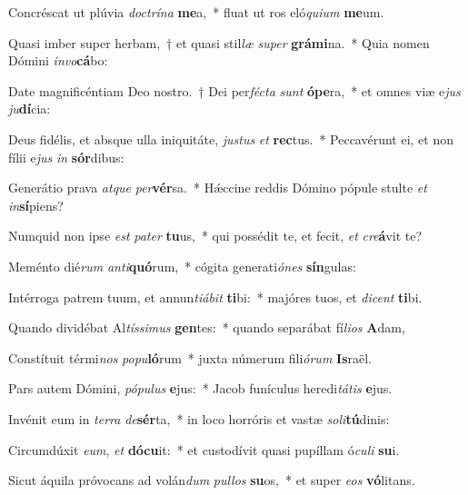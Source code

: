 \item Concréscat ut plúvia \textit{doc}\textit{trí}\textit{na} \textbf{me}a,~* fluat ut ros eló\textit{qui}\textit{um} \textbf{me}um.
\item Quasi imber super herbam,~† et quasi stil\textit{læ} \textit{su}\textit{per} \textbf{grá}\textbf{mi}na.~* Quia nomen Dómini \textit{in}\textit{vo}\textbf{cá}bo:
\item Date magnificéntiam Deo nostro.~† Dei per\textit{féc}\textit{ta} \textit{sunt} \textbf{ó}\textbf{pe}ra,~* et omnes viæ e\textit{jus} \textit{ju}\textbf{dí}cia:
\item Deus fidélis, et absque ulla iniquitáte, \textit{jus}\textit{tus} \textit{et} \textbf{rec}tus.~* Peccavérunt ei, et non fílii e\textit{jus} \textit{in} \textbf{sór}dibus:
\item Generátio prava \textit{at}\textit{que} \textit{per}\textbf{vér}sa.~* Hǽccine reddis Dómino pópule stulte \textit{et} \textit{in}\textbf{sí}piens?
\item Numquid non ipse \textit{est} \textit{pa}\textit{ter} \textbf{tu}us,~* qui possédit te, et fecit, \textit{et} \textit{cre}\textbf{á}vit te?
\item Meménto dié\textit{rum} \textit{an}\textit{ti}\textbf{quó}rum,~* cógita generati\textit{ó}\textit{nes} \textbf{sín}gulas:
\item Intérroga patrem tuum, et annun\textit{ti}\textit{á}\textit{bit} \textbf{ti}bi:~* majóres tuos, et \textit{di}\textit{cent} \textbf{ti}bi.
\item Quando dividébat Al\textit{tís}\textit{si}\textit{mus} \textbf{gen}tes:~* quando separábat fí\textit{li}\textit{os} \textbf{A}dam,
\item Constítuit térmi\textit{nos} \textit{po}\textit{pu}\textbf{ló}rum~* juxta númerum fili\textit{ó}\textit{rum} \textbf{Is}raël.
\item Pars autem Dómini, \textit{pó}\textit{pu}\textit{lus} \textbf{e}jus:~* Jacob funículus heredi\textit{tá}\textit{tis} \textbf{e}jus.
\item Invénit eum in \textit{ter}\textit{ra} \textit{de}\textbf{sér}ta,~* in loco horróris et vastæ \textit{so}\textit{li}\textbf{tú}dinis:
\item Circumdúxit \textit{e}\textit{um}, \textit{et} \textbf{dó}\textbf{cu}it:~* et custodívit quasi pupíllam ó\textit{cu}\textit{li} \textbf{su}i.
\item Sicut áquila próvocans ad volán\textit{dum} \textit{pul}\textit{los} \textbf{su}os,~* et super \textit{e}\textit{os} \textbf{vó}litans.
